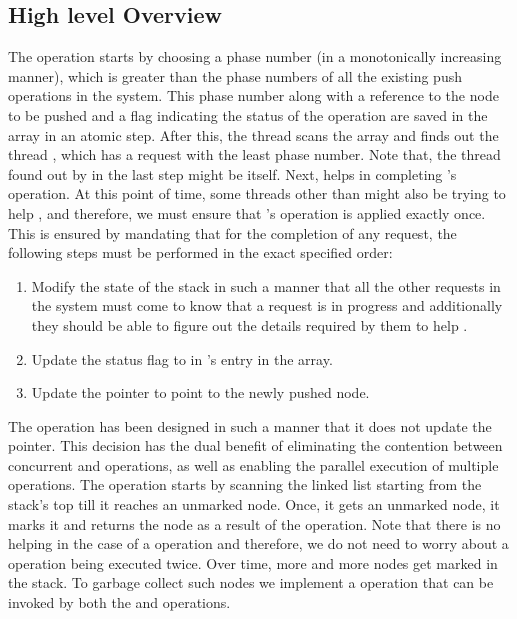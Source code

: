 \documentclass{llncs}
\begin{document}
\subsection{High level Overview}

The  operation starts by choosing a phase number (in a monotonically increasing manner), which is greater than
the phase numbers of all the existing push operations in the system. This phase
number along with a reference to the node to be pushed and a flag indicating
the status of the  operation are saved in the  array in an
atomic step. After this, the thread  scans the  array and finds
out the thread , which has a  request with the least phase
number. Note that, the thread  found out by  in the last step might
be  itself. Next,  helps  in completing 's operation. At
this point of time, some threads other than  might also be trying to help
, and therefore, we must ensure that 's operation is applied exactly
once. This is ensured by mandating that for the completion of any 
request, the following steps must be performed in the exact specified order:

\begin{enumerate} 
\item Modify the state of the stack in such a manner
that all the other  requests in the system must come to know that a
 request  is in progress and additionally they should be able to figure out
the details required by them to help .  
\item Update the status flag to
 in 's entry in the  array.  
\item Update the 
pointer to point to the newly pushed node.  
\end{enumerate}




The  operation has been designed in such a manner that it does not update
the  pointer. This decision has the dual benefit of eliminating the
contention between concurrent  and  operations, as well as enabling the
parallel execution of multiple  operations. The  operation starts by
scanning the linked list starting from the stack's top till it reaches an
unmarked node. Once, it gets an unmarked node, it marks it and returns the node
as a result of the  operation.  Note that there is no helping in the case
of a  operation and therefore, we do not need to worry about a 
operation being executed twice. Over time, more and more nodes get marked in
the stack. To garbage collect such nodes we implement a  operation
that can be invoked by both the  and  operations. 
\end{document}
